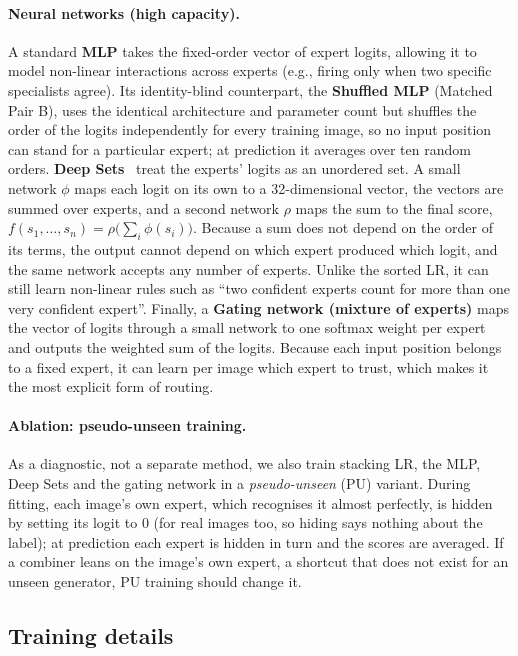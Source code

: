 \documentclass[10pt,a4paper]{article}
\begin{document}
\paragraph{Neural networks (high capacity).}
A standard \textbf{MLP} takes the fixed-order vector of expert logits, allowing it to model non-linear interactions across experts (e.g., firing only when two specific specialists agree). Its identity-blind counterpart, the \textbf{Shuffled MLP} (Matched Pair B), uses the identical architecture and parameter count but shuffles the order of the logits independently for every training image, so no input position can stand for a particular expert; at prediction it averages over ten random orders. \textbf{Deep Sets}~\cite{zaheer2017deepsets} treat the experts' logits as an unordered set. A small network $\phi$ maps each logit on its own to a 32-dimensional vector, the vectors are summed over experts, and a second network $\rho$ maps the sum to the final score, $f(s_1,\dots,s_n) = \rho\big(\sum_i \phi(s_i)\big)$. Because a sum does not depend on the order of its terms, the output cannot depend on which expert produced which logit, and the same network accepts any number of experts. Unlike the sorted LR, it can still learn non-linear rules such as ``two confident experts count for more than one very confident expert''. Finally, a \textbf{Gating network (mixture of experts)} maps the vector of logits through a small network to one softmax weight per expert and outputs the weighted sum of the logits. Because each input position belongs to a fixed expert, it can learn per image which expert to trust, which makes it the most explicit form of routing.

\paragraph{Ablation: pseudo-unseen training.}\label{sec:pseudo}
As a diagnostic, not a separate method, we also train stacking LR, the MLP, Deep Sets and the gating network in a \emph{pseudo-unseen} (PU) variant. During fitting, each image's own expert, which recognises it almost perfectly, is hidden by setting its logit to 0 (for real images too, so hiding says nothing about the label); at prediction each expert is hidden in turn and the scores are averaged. If a combiner leans on the image's own expert, a shortcut that does not exist for an unseen generator, PU training should change it.


\subsection{Training details}\label{sec:training}
\end{document}
